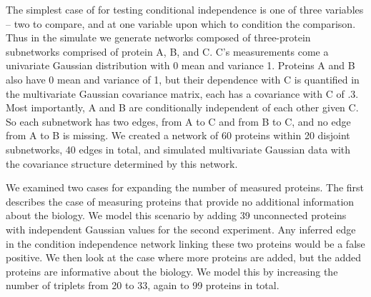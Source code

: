 \documentclass[journal=jacsat,manuscript=article]{achemso}
\begin{document}
The simplest case of for testing conditional independence is one of three variables -- two to compare, and at one variable upon which to condition the comparison.  Thus in the simulate we generate networks composed of three-protein subnetworks comprised of protein A, B, and C.  C's measurements come a univariate Gaussian distribution with 0 mean and variance 1.  Proteins A and B also have 0 mean and variance of 1, but their dependence with C is quantified in the multivariate Gaussian covariance matrix, each has a covariance with C of .3.  Most importantly, A and B are conditionally independent of each other given C.  So each subnetwork has two edges, from A to C and from B to C, and no edge from A to B is missing.  We created a network of 60 proteins within 20 disjoint subnetworks, 40 edges in total, and simulated multivariate Gaussian data with the covariance structure determined by this network.

We examined two cases for expanding the number of measured proteins.  The first describes the case of measuring proteins that provide no additional information about the biology.  We model this scenario by adding 39 unconnected proteins with independent Gaussian values for the second experiment.  Any inferred edge in the condition independence network linking these two proteins would be a false positive.  We then look at the case where more proteins are added, but the added proteins are informative about the biology.  We model this by increasing the number of triplets from 20 to 33, again to 99 proteins in total.
\end{document}
